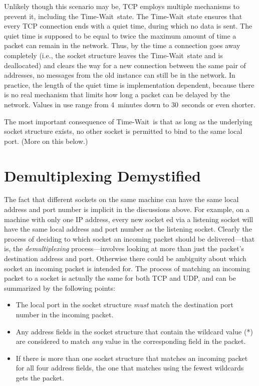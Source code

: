 Unlikely though this scenario may be, TCP employs multiple mechanisms
to prevent it, including the Time-Wait\ state.  The Time-Wait\ state
ensures that every TCP connection ends with a quiet time, during which
no data is sent.  The quiet time is supposed to be equal to twice the
maximum amount of time a packet can remain in the network.  Thus, by
the time a connection goes away completely (i.e., the socket structure
leaves the Time-Wait\ state and is deallocated) and clears the way for
a new connection between the same pair of addresses, no messages from
the old instance can still be in the network.  In practice, the length
of the quiet time is implementation dependent, because there is no
real mechanism that limits how long a packet can be delayed by the
network.  Values in use range from 4~minutes down to 30~seconds or
even shorter.

The most important consequence of Time-Wait\ is that as long as the
underlying socket structure exists, no other socket is permitted to
bind to the same local port.  (More on this below.)

\section{Demultiplexing Demystified}
\label{sect:demux}%

The fact that different sockets on the same machine can have the same
local address and port number is implicit in the discussions above.
For example, on a machine with only one IP address, every
new socket ed via a listening socket
will have the same local address and port number
as the listening socket.  
Clearly the process
of deciding to which socket an incoming packet should be
delivered---that is, the \emph{demultiplexing} process---involves
looking at {more} than just the packet's destination address and port.
Otherwise there could be ambiguity about which socket an incoming
packet is intended for.  The process of matching an incoming packet to
a socket is actually the same for both TCP and UDP, and can be
summarized by the following points:
\begin{itemize}
\item The local port
in the socket structure \emph{must} match the destination port number
in the incoming packet.
\item Any address fields in the socket
structure that contain the wildcard value (*) are considered to match
\emph{any} value in the corresponding field in the packet.
\item If there is more than one socket structure that matches an incoming
packet for all four address fields, the one that matches using the
fewest wildcards gets the packet.
\end{itemize}

